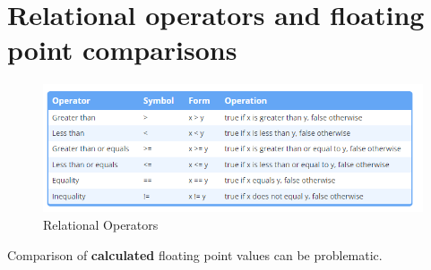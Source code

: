 \documentclass[
  letterpaper,
  DIV=11,
  numbers=noendperiod]{scrreprt}
\begin{document}
\hypertarget{relational-operators-and-floating-point-comparisons}{%
\section{Relational operators and floating point
comparisons}\label{relational-operators-and-floating-point-comparisons}}

\begin{figure}

{\centering \includegraphics{./figure/relationalOperator.PNG}

}

\caption{Relational Operators}

\end{figure}

Comparison of \textbf{calculated} floating point values can be
problematic.
\end{document}
